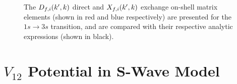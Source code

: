 \documentclass{article}
\begin{document}
\begin{figure}[h]
  \begin{center}
    
  \end{center}
  \caption[On-Shell Matrix Elements 1s-3s]{
    The $D_{f, i}(k', k)$ direct and $X_{f, i}(k', k)$ exchange on-shell
    matrix elements (shown in red and blue respectively) are presented for the
    $1s \to 3s$ transition, and are compared with their respective analytic
    expressions (shown in black).
  }
  \label{fig:on-me-1s-3s}
\end{figure}

\clearpage

\section{$V_{1 2}$ Potential in S-Wave Model}
\label{sec:v12-swave}
\end{document}
